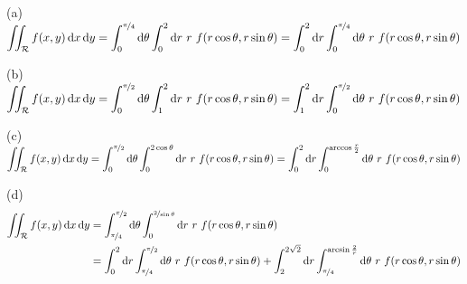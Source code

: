 
\begin{answer}

(a)
$\displaystyle\iint_{\mathcal{R}} f(x,y)\,\mathrm{d}x\,\mathrm{d}y
=\int_0^{\nicefrac{\pi}{4}}\mathrm{d}\theta
 \int_0^2\mathrm{d}r\ r\ f(r\cos\theta,r\sin\theta)
=\int_0^2\mathrm{d}r
  \int_0^{\nicefrac{\pi}{4}}\mathrm{d}\theta
 \ r\ f(r\cos\theta,r\sin\theta)$

(b)
$\displaystyle\iint_{\mathcal{R}} f(x,y)\,\mathrm{d}x\,\mathrm{d}y
=\int_0^{\nicefrac{\pi}{2}}\mathrm{d}\theta
 \int_1^2\mathrm{d}r\ r\ f(r\cos\theta,r\sin\theta)
=\int_1^2\mathrm{d}r
  \int_0^{\nicefrac{\pi}{2}}\mathrm{d}\theta
 \ r\ f(r\cos\theta,r\sin\theta)$

(c)
$\displaystyle \iint_{\mathcal{R}} f(x,y)\,\mathrm{d}x\,\mathrm{d}y
=\int_0^{\nicefrac{\pi}{2}}\mathrm{d}\theta
 \int_0^{2\cos\theta}\mathrm{d}r\ r\ f(r\cos\theta,r\sin\theta)
=\int_0^2\mathrm{d}r
  \int_0^{\arccos\frac{r}{2}}\mathrm{d}\theta
 \ r\ f(r\cos\theta,r\sin\theta)$

(d)
\begin{align*}
\dblInt_\cR f(x,y)\,\dee{x}\,\dee{y}
&=\int_{\nicefrac{\pi}{4}}^{\nicefrac{\pi}{2}}\dee{\theta}
 \int_0^{\nicefrac{2}{\sin\theta}}\dee{r}\ r\ f(r\cos\theta,r\sin\theta)\\
&=\int_0^2\dee{r}
  \int_{\nicefrac{\pi}{4}}^{\nicefrac{\pi}{2}}\dee{\theta}
 \ r\ f(r\cos\theta,r\sin\theta)
+\int_2^{2\sqrt{2}}\dee{r}
  \int_{\nicefrac{\pi}{4}}^{\arcsin\frac{2}{r}}\dee{\theta}
 \ r\ f(r\cos\theta,r\sin\theta)
\end{align*}

\end{answer}

